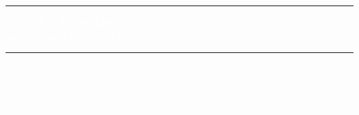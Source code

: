 \documentclass[a4paper,twoside,11pt]{article}
\begin{document}

\begin{titlepage}
\pagecolor{titlepagecolor}

\vspace*{25mm}
{\color{white} \noindent \rule{\textwidth}{3mm}}
\begin{center}
\Huge
\textcolor{white}{\textbf{GPLOT}: A \textbf{DIMFILM} Based Graph Plotting \\ and Drawing Program for CDC NOS 2.8}
\end{center}
\vspace*{2mm}
{\color{white} \noindent \rule{\textwidth}{3mm}}

\vspace*{6cm}

\begin{center}
\Large 
\textcolor{white}{
  Nick Glazzard
}
\end{center}

\vspace*{2cm}

\begin{center}
\Large 
\textcolor{white}{
Version 0.87\\
\today
}
\end{center}

\end{titlepage}

\pagecolor{white}



\clearpage

\tableofcontents

\clearpage
\end{document}
